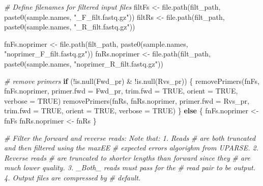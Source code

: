 \documentclass[
]{article}
\newenvironment{Shaded}{\begin{snugshade}}{\end{snugshade}}
\newcommand{\AttributeTok}[1]{\textcolor[rgb]{0.77,0.63,0.00}{#1}}
\newcommand{\CommentTok}[1]{\textcolor[rgb]{0.56,0.35,0.01}{\textit{#1}}}
\newcommand{\ConstantTok}[1]{\textcolor[rgb]{0.00,0.00,0.00}{#1}}
\newcommand{\ControlFlowTok}[1]{\textcolor[rgb]{0.13,0.29,0.53}{\textbf{#1}}}
\newcommand{\FunctionTok}[1]{\textcolor[rgb]{0.00,0.00,0.00}{#1}}
\newcommand{\NormalTok}[1]{#1}
\newcommand{\OtherTok}[1]{\textcolor[rgb]{0.56,0.35,0.01}{#1}}
\newcommand{\SpecialCharTok}[1]{\textcolor[rgb]{0.00,0.00,0.00}{#1}}
\newcommand{\StringTok}[1]{\textcolor[rgb]{0.31,0.60,0.02}{#1}}
\begin{document}
\begin{Shaded}
\begin{Highlighting}[]
\CommentTok{\# Define filenames for filtered input files}
\NormalTok{filtFs }\OtherTok{\textless{}{-}} \FunctionTok{file.path}\NormalTok{(filt\_path, }\FunctionTok{paste0}\NormalTok{(sample.names, }\StringTok{"\_F\_filt.fastq.gz"}\NormalTok{))}
\NormalTok{filtRs }\OtherTok{\textless{}{-}} \FunctionTok{file.path}\NormalTok{(filt\_path, }\FunctionTok{paste0}\NormalTok{(sample.names, }\StringTok{"\_R\_filt.fastq.gz"}\NormalTok{))}

\NormalTok{fnFs.noprimer }\OtherTok{\textless{}{-}} \FunctionTok{file.path}\NormalTok{(filt\_path, }\FunctionTok{paste0}\NormalTok{(sample.names, }\StringTok{"noprimer\_F\_filt.fastq.gz"}\NormalTok{))}
\NormalTok{fnRs.noprimer }\OtherTok{\textless{}{-}} \FunctionTok{file.path}\NormalTok{(filt\_path, }\FunctionTok{paste0}\NormalTok{(sample.names, }\StringTok{"noprimer\_R\_filt.fastq.gz"}\NormalTok{))}

\CommentTok{\# remove primers}
\ControlFlowTok{if}\NormalTok{ (}\SpecialCharTok{!}\FunctionTok{is.null}\NormalTok{(Fwd\_pr) }\SpecialCharTok{\&} \SpecialCharTok{!}\FunctionTok{is.null}\NormalTok{(Rvs\_pr)) \{}
    \FunctionTok{removePrimers}\NormalTok{(fnFs, fnFs.noprimer, }\AttributeTok{primer.fwd =}\NormalTok{ Fwd\_pr, }\AttributeTok{trim.fwd =} \ConstantTok{TRUE}\NormalTok{, }
        \AttributeTok{orient =} \ConstantTok{TRUE}\NormalTok{, }\AttributeTok{verbose =} \ConstantTok{TRUE}\NormalTok{)}
    \FunctionTok{removePrimers}\NormalTok{(fnRs, fnRs.noprimer, }\AttributeTok{primer.fwd =}\NormalTok{ Rvs\_pr, }\AttributeTok{trim.fwd =} \ConstantTok{TRUE}\NormalTok{, }
        \AttributeTok{orient =} \ConstantTok{TRUE}\NormalTok{, }\AttributeTok{verbose =} \ConstantTok{TRUE}\NormalTok{)}
\NormalTok{\} }\ControlFlowTok{else}\NormalTok{ \{}
\NormalTok{    fnFs.noprimer }\OtherTok{\textless{}{-}}\NormalTok{ fnFs}
\NormalTok{    fnRs.noprimer }\OtherTok{\textless{}{-}}\NormalTok{ fnRs}
\NormalTok{\}}

\CommentTok{\# Filter the forward and reverse reads: Note that: 1. Reads}
\CommentTok{\# are both truncated and then filtered using the maxEE}
\CommentTok{\# expected errors algorighm from UPARSE.  2. Reverse reads}
\CommentTok{\# are truncated to shorter lengths than forward since they}
\CommentTok{\# are much lower quality.  3. \_Both\_ reads must pass for the}
\CommentTok{\# read pair to be output.  4. Output files are compressed by}
\CommentTok{\# default.}


\end{Highlighting}
\end{Shaded}
\end{document}
